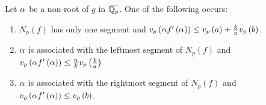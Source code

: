 \documentclass[../main.tex]{subfiles}
\begin{document}

\begin{lemma}
  \label{lem:non_exceptional_root}
  Let $\alpha$ be a non-\ex root of $g$ in $\overline{\mathbb{Q}_p}$.
  One of the following occurs:
  \begin{enumerate}
    \item $N_p\left( f \right)$ has only one segment and $v_p\left( \alpha f'\left( \alpha \right) \right) \leq v_p\left( a \right) + \frac{k}{n}v_p\left( b \right)$.
    \item $\alpha$ is associated with the leftmost segment of $N_p\left( f \right)$ and $v_p\left( \alpha f'\left( \alpha \right) \right) \leq \frac{n}{k} v_p\left( \frac{b}{a} \right)$
    \item $\alpha$ is associated with the rightmost segment of $N_p\left( f \right)$ and $v_p\left( \alpha f'\left( \alpha \right) \right) \leq v_p\left( b \right)$.
  \end{enumerate}
\end{lemma}
\end{document}
